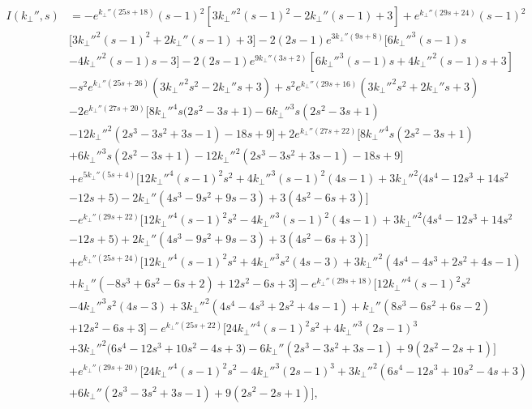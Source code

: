 \documentclass{jfm}
\begin{document}
\begin{align}
I(k_\perp'',s)&=-e^{k_\perp'' (25 s+18)}(s-1)^2\left[3 k_\perp''^2 (s-1)^2-2 k_\perp'' (s-1)+3\right]+e^{k_\perp'' (29 s+24)}(s-1)^2\nonumber\\
&\big[3 k_\perp''^2 (s-1)^2+2 k_\perp'' (s-1)+3\big]-2 (2 s-1) e^{3 k_\perp'' (9 s+8)} \big[6 k_\perp''^3 (s-1) s\nonumber\\
&-4 k_\perp''^2 (s-1) s-3\big]-2 (2 s-1) e^{9 k_\perp'' (3 s+2)} \left[6 k_\perp''^3 (s-1) s+4 k_\perp''^2 (s-1) s+3\right]\nonumber\\
&-s^2 e^{k_\perp'' (25 s+26)} \left(3 k_\perp''^2 s^2-2 k_\perp'' s+3\right)+s^2 e^{k_\perp'' (29 s+16)} \left(3 k_\perp''^2 s^2+2 k_\perp'' s+3\right)\nonumber\\
&-2 e^{k_\perp'' (27 s+20)} \big[8 k_\perp''^4 s \big(2 s^2-3 s+1\big)-6 k_\perp''^3 s \left(2 s^2-3 s+1\right)\nonumber\\
&-12 k_\perp''^2 \left(2 s^3-3 s^2+3 s-1\right)-18 s+9\big]+2 e^{k_\perp'' (27 s+22)} \big[8 k_\perp''^4 s \left(2 s^2-3 s+1\right)\nonumber\\
&+6 k_\perp''^3 s \left(2 s^2-3 s+1\right)-12 k_\perp''^2 \left(2 s^3-3 s^2+3 s-1\right)-18 s+9\big]\nonumber\\
&+e^{5 k_\perp'' (5 s+4)} \big[12 k_\perp''^4 (s-1)^2 s^2+4 k_\perp''^3 (s-1)^2 (4 s-1)+3 k_\perp''^2 \big(4 s^4-12 s^3+14 s^2\nonumber\\
&-12 s+5\big)-2 k_\perp'' \left(4 s^3-9 s^2+9 s-3\right)+3 \left(4 s^2-6 s+3\right)\big]\nonumber\\
&-e^{k_\perp'' (29 s+22)} \big[12 k_\perp''^4 (s-1)^2 s^2-4 k_\perp''^3 (s-1)^2 (4 s-1)+3 k_\perp''^2 \big(4 s^4-12 s^3+14 s^2\nonumber\\
&-12 s+5\big)+2 k_\perp'' \left(4 s^3-9 s^2+9 s-3\right)+3 \left(4 s^2-6 s+3\right)\big]\nonumber\\
&+e^{k_\perp'' (25 s+24)} \big[12 k_\perp''^4 (s-1)^2 s^2+4 k_\perp''^3 s^2 (4 s-3)+3 k_\perp''^2 \left(4 s^4-4 s^3+2 s^2+4 s-1\right)\nonumber\\
&+k_\perp'' \left(-8 s^3+6 s^2-6 s+2\right)+12 s^2-6 s+3\big]-e^{k_\perp'' (29 s+18)} \big[12 k_\perp''^4 (s-1)^2 s^2\nonumber\\
&-4 k_\perp''^3 s^2 (4 s-3)+3 k_\perp''^2 \left(4 s^4-4 s^3+2 s^2+4 s-1\right)+k_\perp'' \left(8 s^3-6 s^2+6 s-2\right)\nonumber\\
&+12 s^2-6 s+3\big]-e^{k_\perp'' (25 s+22)} \big[24 k_\perp''^4 (s-1)^2 s^2+4 k_\perp''^3 (2 s-1)^3\nonumber\\
&+3 k_\perp''^2 \big(6 s^4-12 s^3+10 s^2-4 s+3\big)-6 k_\perp'' \left(2 s^3-3 s^2+3 s-1\right)+9 \left(2 s^2-2 s+1\right)\big]\nonumber\\
&+e^{k_\perp'' (29 s+20)} \big[24 k_\perp''^4 (s-1)^2 s^2-4 k_\perp''^3 (2 s-1)^3+3 k_\perp''^2 \left(6 s^4-12 s^3+10 s^2-4 s+3\right)\nonumber\\
&+6 k_\perp'' \left(2 s^3-3 s^2+3 s-1\right)+9 \left(2 s^2-2 s+1\right)\big],
\end{align}
\end{document}
